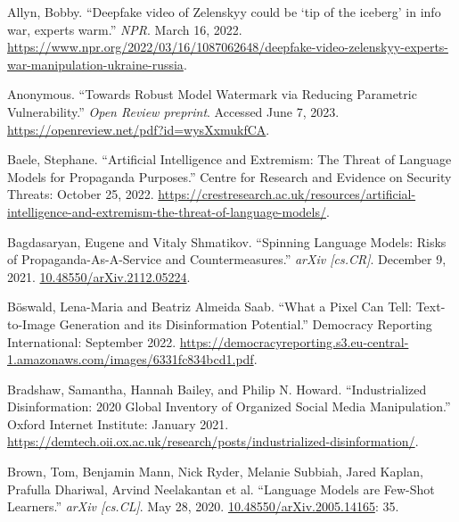 \documentclass{article}
\begin{document}
\begin{thebibliography}{9}

  Allyn, Bobby. ``Deepfake video of Zelenskyy could be `tip of the iceberg' in info war, experts warm.'' \textit{NPR}. March 16, 2022. \href{https://www.npr.org/2022/03/16/1087062648/deepfake-video-zelenskyy-experts-war-manipulation-ukraine-russia}{https://www.npr.org/2022/03/16/1087062648/deepfake-video-zelenskyy-experts-war-manipulation-ukraine-russia}. 

  Anonymous. ``Towards Robust Model Watermark via Reducing Parametric Vulnerability.'' \textit{Open Review preprint}. Accessed June 7, 2023. \href{https://openreview.net/pdf?id=wysXxmukfCA}{https://openreview.net/pdf?id=wysXxmukfCA}. 

  Baele, Stephane. ``Artificial Intelligence and Extremism: The Threat of Language Models for Propaganda Purposes.'' Centre for Research and Evidence on Security Threats: October 25, 2022. \href{https://crestresearch.ac.uk/resources/artificial-intelligence-and-extremism-the-threat-of-language-models/}{https://crestresearch.ac.uk/resources/artificial-intelligence-and-extremism-the-threat-of-language-models/}.

  Bagdasaryan, Eugene and Vitaly Shmatikov. ``Spinning Language Models: Risks of Propaganda-As-A-Service and Countermeasures.'' \textit{arXiv [cs.CR]}. December 9, 2021. \href{https://arxiv.org/abs/2112.05224}{10.48550/arXiv.2112.05224}.

  Böswald, Lena-Maria and Beatriz Almeida Saab. ``What a Pixel Can Tell: Text-to-Image Generation and its Disinformation Potential.'' Democracy Reporting International: September 2022. \href{https://democracyreporting.s3.eu-central-1.amazonaws.com/images/6331fc834bcd1.pdf}{https://democracyreporting.s3.eu-central-1.amazonaws.com/images/6331fc834bcd1.pdf}. 

  Bradshaw, Samantha, Hannah Bailey, and Philip N. Howard. ``Industrialized Disinformation: 2020 Global Inventory of Organized Social Media Manipulation.'' Oxford Internet Institute: January 2021. \href{https://demtech.oii.ox.ac.uk/research/posts/industrialized-disinformation/}{https://demtech.oii.ox.ac.uk/research/posts/industrialized-disinformation/}. 

  Brown, Tom, Benjamin Mann, Nick Ryder, Melanie Subbiah, Jared Kaplan, Prafulla Dhariwal, Arvind Neelakantan et al. ``Language Models are Few-Shot Learners.'' \textit{arXiv [cs.CL]}. May 28, 2020. \href{https://arxiv.org/abs/2005.14165}{10.48550/arXiv.2005.14165}: 35.


\end{thebibliography}
\end{document}
